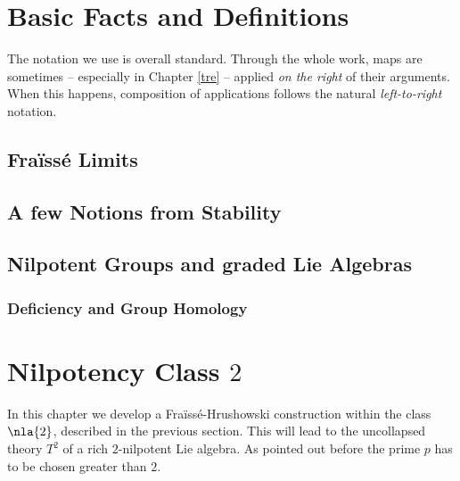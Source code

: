 \documentclass[a4paper,twoside,10pt,ngerman,english]{report}
\renewcommand{\maketitle}{}
\begin{document}
\setcounter{page}{1}
\maketitle

\tableofcontents
\newpage
\thispagestyle{empty}
\cleardoublepage
{}
\setcounter{page}{1}

%
\newpage
\thispagestyle{empty}
\cleardoublepage
\chapter{Basic Facts and Definitions}\label{uno}
The notation we use is overall standard.
Through the whole work, maps are sometimes -- especially
in Chapter \ref{tre} -- applied
{\em on the right} of their arguments. When this happens,
composition of applications follows the natural
{\em left-to-right} notation.

\section{Fra\"iss\'e Limits}\label{fraisse}

\section{A few Notions from Stability}\label{stab}

\section{Nilpotent Groups and graded Lie Algebras}\label{nilgral}

%
%
\subsection{Deficiency and Group Homology}\label{schur}

\newpage
\thispagestyle{empty}
\cleardoublepage
\chapter{Nilpotency Class $2$}\label{due}
In this chapter we develop a Fra\"iss\'e-Hrushowski construction within the class $\nla{2}$, described
in the previous section. This will lead to
the uncollapsed theory $T^{2}$ of a rich $2$-nilpotent Lie algebra. As pointed out before the prime $p$ has to
be chosen greater than $2$.
\end{document}
